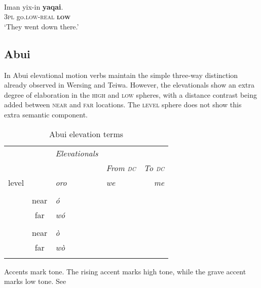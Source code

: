  

   

 



\ea%
\label{ex:7:8}
 \\
\gll Iman     yix-in \textbf{yaqai}. \\
       \textsc{3pl} go.\textsc{low}{}-\textsc{real} \textbf{\textsc{low}} \\
\glt  `They went down there.'
\z

 

 



\subsection{Abui}
In Abui elevational motion verbs maintain the simple three-way distinction already observed in Wersing and Teiwa. However, the elevationals show an extra degree of elaboration in the \textsc{high} and \textsc{low} spheres, with a distance contrast being added between \textsc{near} and \textsc{far} locations. The \textsc{level} sphere does not show this extra semantic component.



\begin{table}\centering
\caption{Abui elevation terms}
\label{tab:7:abui}
\begin{tabularx}{\textwidth}{>{\sc}l>{\sc}S>{\it}X>{\it}X>{\it}r}
\lsptoprule
& 		& \rm Elevationals 		& \\ 
		& 		&              		& \rm From \textsc{dc} & \rm To \textsc{dc}\\
\midrule
{level}	&  		& {oro}			& we 		& me \\
\\
	& {near}& \textit{\'o} {\rm\dag} 	&  	& \\
		& {far} & {w\'o} 		&        	& 			\\
\\
  	& {near}& ò 		& 		&         \\
		& {far} & {w\`o} 		&  		&				\\
\lspbottomrule
\end{tabularx}

{\dag} Accents mark tone. The rising accent marks high tone, while the grave accent marks low tone. See \citet[60]{Kratochvil2007}
\end{table}

